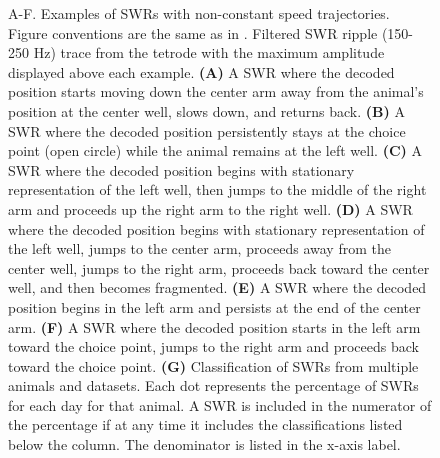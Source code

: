 \documentclass[9pt,lineno]{elife}
\begin{document}
\begin{figure}
\caption{A-F. Examples of SWRs with non-constant speed trajectories. Figure conventions are the same as in . Filtered SWR ripple (150-250 Hz) trace from the tetrode with the maximum amplitude displayed above each example. \textbf{(A)} A SWR where the decoded position starts moving down the center arm away from the animal's position at the center well, slows down, and returns back. \textbf{(B)} A SWR where the decoded position persistently stays at the choice point (open circle) while the animal remains at the left well. \textbf{(C)} A SWR where the decoded position begins with stationary representation of the left well, then jumps to the middle of the right arm and proceeds up the right arm to the right well. \textbf{(D)} A SWR where the decoded position begins with stationary representation of the left well, jumps to the center arm, proceeds away from the center well, jumps to the right arm, proceeds back toward the center well, and then becomes fragmented. \textbf{(E)} A SWR where the decoded position begins in the left arm and persists at the end of the center arm. \textbf{(F)} A SWR where the decoded position starts in the left arm toward the choice point, jumps to the right arm and proceeds back toward the choice point. \textbf{(G)} Classification of SWRs from multiple animals and datasets. Each dot represents the percentage of SWRs for each day for that animal. A SWR is included in the numerator of the percentage if at any time it includes the classifications listed below the column. The denominator is listed in the x-axis label.
}
\label{fig:3}



\end{figure}
\end{document}
